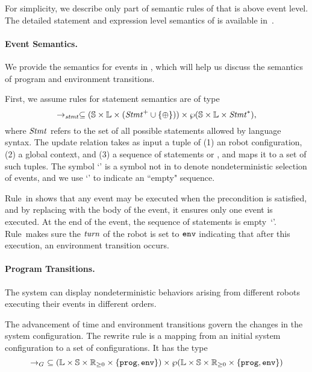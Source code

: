 
For simplicity, we describe only part of semantic rules of \lgname that is above event level.
The detailed statement and expression level semantics of \lgname is available in~\cite{}.

\paragraph{Event Semantics.}
We provide the semantics for events in \lgname,
which will help us discuss the semantics of program and environment transitions.

First, we assume rules for statement semantics are of type
\[
\rightarrow_\mathit{stmt} \subseteq (\mathbb{S} \times \mathbb{L}\times (\mathit{Stmt}^+ \cup \{\mathtt{\oplus}\})) \times \wp(\mathbb{S}\times \mathbb{L} \times \mathit{Stmt}^*),
\]
where $\mathit{Stmt}$ refers to the set of all possible statements allowed by language syntax.
The update relation takes as input a tuple of (1) an robot configuration, (2) a global context, and (3) a sequence of statements or \SelectEvent,
and maps it to a set of such tuples.
The symbol `\SelectEvent' is a symbol not in \lgname to denote nondeterministic selection of events,
and we use `\EndEvent' to indicate an ``empty" sequence.

Rule~\SelectEventRule in  shows that any event may be executed when the precondition is satisfied,
and by replacing \SelectEvent with the body of the event, it ensures only one event is executed.
At the end of the event, the sequence of statements is empty~`\EndEvent'.
Rule~\EndEventRule makes sure the $\mathit{turn}$ of the robot is set to $\mathtt{env}$ indicating that after this execution,
an environment transition occurs.


\paragraph{Program Transitions.}

The system can display nondeterministic behaviors arising from different robots executing their events in different orders.

The advancement of time and environment transitions govern the changes in the system configuration.
The rewrite rule is a mapping from an initial system configuration to a set of configurations.
It has the type
$$\rightarrow_G\ \subseteq (\pwl\times \pws \times \nnreals \times \{\prog,\env\}) \times \wp(\pwl\times\pws \times \nnreals\times \{\prog,\env\}) $$

